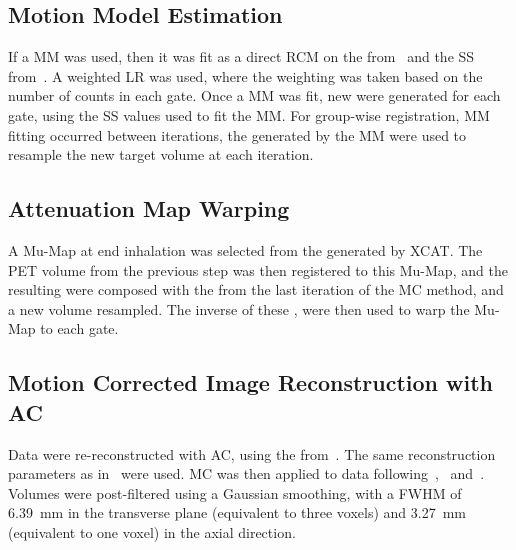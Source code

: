     
    \subsection{Motion Model Estimation} \label{sec:motion_model_estimation}
        If a \gls{MM} was used, then it was fit as a direct \acrlong{RCM} on the  from~ and the \gls{SS} from~. A weighted \acrlong{LR} was used, where the weighting was taken based on the number of counts in each gate. Once a \gls{MM} was fit, new  were generated for each gate, using the \gls{SS} values used to fit the \gls{MM}. For group-wise registration, \gls{MM} fitting occurred between iterations, the  generated by the \gls{MM} were used to resample the new target volume at each iteration.
    
    
    \subsection{Attenuation Map Warping} \label{sec:attenuation_map_warping}
        A \gls{Mu-Map} at end inhalation was selected from the  generated by \gls{XCAT}. The \gls{PET} volume from the previous step was then registered to this \gls{Mu-Map}, and the resulting  were composed with the  from the last iteration of the \gls{MC} method, and a new volume resampled. The inverse of these , were then used to warp the \gls{Mu-Map} to each gate.
    
    
    \subsection{Motion Corrected Image Reconstruction with AC} \label{sec:attenuation_corrected_image_reconstruction}
        Data were re-reconstructed with \gls{AC}, using the  from~. The same reconstruction parameters as in~ were used. \gls{MC} was then applied to data following~,~ and~. Volumes were post-filtered using a Gaussian smoothing, with a \gls{FWHM} of \SI{6.39}{\milli\metre} in the transverse plane (equivalent to three voxels) and \SI{3.27}{\milli\metre} (equivalent to one voxel) in the axial direction.
    
